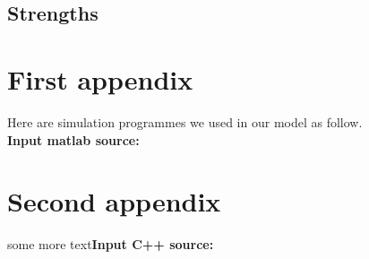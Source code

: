 \subsection{Strengths}
\begin{thebibliography}{99}
\end{thebibliography}
\begin{appendices}
\section{First appendix}
Here are simulation programmes we used in our model as follow.\\
\textbf{\textcolor[rgb]{0.98,0.00,0.00}{Input matlab source:}}

\section{Second appendix}
some more text\textcolor[rgb]{0.98,0.00,0.00}{\textbf{Input C++ source:}}

\end{appendices}
